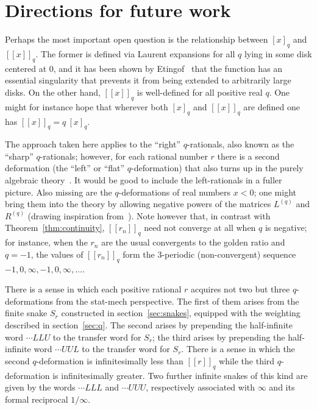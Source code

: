 \documentclass[12pt]{article}
\theoremstyle{plain}
\theoremstyle{definition}
\theoremstyle{remark}
\newcommand{\llb}{[\![}
\newcommand{\rrb}{]\!]}
\begin{document}
\section{Directions for future work}
\label{sec:future}

Perhaps the most important open question is
the relationship between $[x]_q$ and $\llb x \rrb_q$.
The former is defined via Laurent expansions
for all $q$ lying in some disk centered at 0,
and it has been shown by Etingof~\cite{E25}
that the function has an essential singularity
that prevents it from being extended
to arbitrarily large disks.
On the other hand, $\llb x \rrb_q$
is well-defined for all positive real $q$.
One might for instance hope that
wherever both $[x]_q$ and $\llb x \rrb_q$ are defined
one has $\llb x \rrb_q = q \: [x]_q$.

\bigskip

The approach taken here applies to the ``right'' $q$-rationals,
also known as the ``sharp'' $q$-rationals;
however, for each rational number $r$ there is a second deformation
(the ``left'' or ``flat'' $q$-deformation)
that also turns up in the purely algebraic theory~\cite{BBL23}.
It would be good to include the left-rationals in a fuller picture.
Also missing are the $q$-deformations of real numbers $x<0$;
one might bring them into the theory
by allowing negative powers of the matrices $L^{(q)}$ and $R^{(q)}$
(drawing inspiration from~\cite{P01}).
Note however that, in contrast with Theorem~\ref{thm:continuity},
$\llb r_n \rrb_q$ need not converge at all when $q$ is negative;
for instance, when the $r_n$ are the usual convergents
to the golden ratio and $q=-1$, the values of $\llb r_n \rrb_q$ 
form the 3-periodic (non-convergent) sequence
$-1,0,\infty,-1,0,\infty,\dots$.

There is a sense in which each positive rational $r$
acquires not two but three $q$-deformations
from the stat-mech perspective. 
The first of them arises from the finite snake $S_r$
constructed in section~\ref{sec:snakes},
equipped with the weighting described in section~\ref{sec:q}.
The second arises by prepending the half-infinite word $\cdots LLU$
to the transfer word for $S_r$;
the third arises by prepending the half-infinite word $\cdots UUL$
to the transfer word for $S_r$.
There is a sense in which the second $q$-deformation
is infinitesimally less than $\llb r \rrb_q$
while the third $q$-deformation is infinitesimally greater.
Two further infinite snakes of this kind are given by
the words $\cdots LLL$ and $\cdots UUU$,
respectively associated with $\infty$ and its formal reciprocal $1/\infty$.
\end{document}
